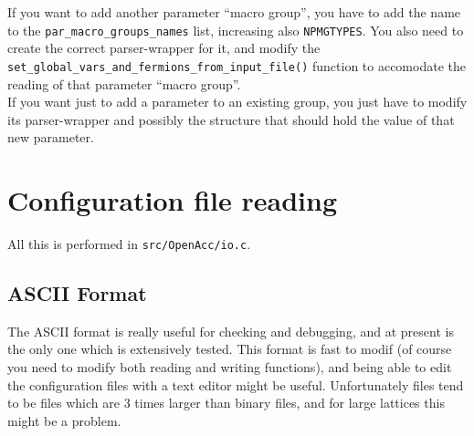 If you want to add another parameter ``macro group'', you have to add the name 
to the \verb|par_macro_groups_names| list, increasing also \verb|NPMGTYPES|.
You also need to create the correct parser-wrapper for it, and modify the 
\verb|set_global_vars_and_fermions_from_input_file()| function to accomodate 
the reading of that parameter ``macro group''.\\
If you want just to add a parameter to an existing group, you just have to 
modify its parser-wrapper and possibly the structure that should hold the value 
of that new parameter.

\section{Configuration file reading}
All this is performed in \verb|src/OpenAcc/io.c|.

\subsection{ASCII Format}
The ASCII format is really useful for checking and debugging, and at present is 
the only one which is extensively tested. This format is fast to modif (of 
course you need to modify both reading and writing functions), and being able 
to edit the configuration files with a text editor might be useful.
Unfortunately files tend to be files which are 3 times larger than binary 
files, and for large lattices this might be a problem.

